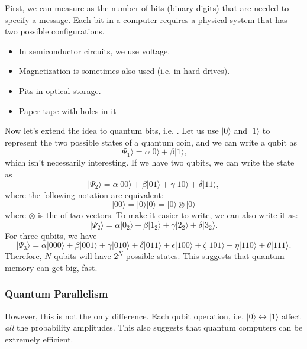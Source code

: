 \documentclass{article}
\numberwithin{equation}{section}
\begin{document}
First, we can measure  as the number of bits (binary digits) that are needed to specify a message. Each bit in a computer requires a physical system that has two possible configurations.
\begin{itemize}
    \item In semiconductor circuits, we use voltage.
    \item Magnetization is sometimes also used (i.e. in hard drives).
    \item Pits in optical storage.
    \item Paper tape with holes in it
\end{itemize}
Now let's extend the idea to quantum bits, i.e. . Let us use $|0\rangle$ and $|1\rangle$ to represent the two possible states of a quantum coin, and we can write a qubit as 
\begin{equation}
    |\Psi_1\rangle = \alpha|0\rangle + \beta|1\rangle,
\end{equation}
which isn't necessarily interesting.  If we have two qubits, we can write the state as
\begin{equation}
    |\Psi_2\rangle = \alpha|00\rangle + \beta|01\rangle + \gamma|10\rangle + \delta|11\rangle,
\end{equation}
where the following notation are equivalent:
\begin{equation}
    |00\rangle = |0\rangle|0\rangle = |0\rangle \otimes |0\rangle
\end{equation}
where $\otimes$ is the  of two vectors. To make it easier to write, we can also write it as:
\begin{equation}
    | \Psi_2 \rangle = \alpha |0_2\rangle + \beta|1_2\rangle + \gamma |2_2\rangle + \delta|3_2\rangle.
\end{equation}
For three qubits, we have
\begin{equation}
    |\Psi_3\rangle = \alpha |000\rangle + \beta|001\rangle + \gamma|010\rangle + \delta|011\rangle + \epsilon|100\rangle + \zeta|101\rangle + \eta|110\rangle + \theta|111\rangle.
\end{equation}
Therefore, $N$ qubits will have $2^N$ possible states. This suggests that quantum memory can get big, fast.
\subsubsection{Quantum Parallelism}
However, this is not the only difference. Each qubit operation, i.e. $|0\rangle \longleftrightarrow |1\rangle$ affect \textit{all} the probability amplitudes. This also suggests that quantum computers can be extremely efficient.
\end{document}
